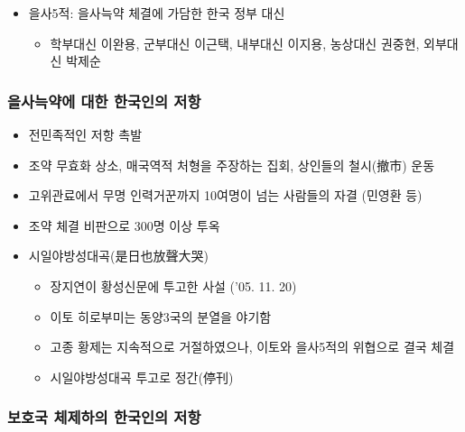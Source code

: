 \begin{itemize}
    \item 을사5적: 을사늑약 체결에 가담한 한국 정부 대신
    \begin{itemize}
        \item 학부대신 이완용, 군부대신 이근택, 내부대신 이지용, 농상대신 권중현, 외부대신 박제순
    \end{itemize}
\end{itemize}

\subsubsection*{을사늑약에 대한 한국인의 저항}

\begin{itemize}
    \item 전민족적인 저항 촉발
    \item 조약 무효화 상소, 매국역적 처형을 주장하는 집회, 상인들의 철시(撤市) 운동
    \item 고위관료에서 무명 인력거꾼까지 10여명이 넘는 사람들의 자결 (민영환 등)
    \item 조약 체결 비판으로 300명 이상 투옥
    \item 시일야방성대곡(是日也放聲大哭)
    \begin{itemize}
        \item 장지연이 황성신문에 투고한 사설 ('05. 11. 20)
        \item 이토 히로부미는 동양3국의 분열을 야기함
        \item 고종 황제는 지속적으로 거절하였으나, 이토와 을사5적의 위협으로 결국 체결
        \item 시일야방성대곡 투고로 정간(停刊)
    \end{itemize}
\end{itemize}

\subsubsection*{보호국 체제하의 한국인의 저항}

